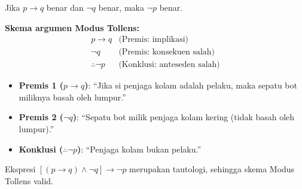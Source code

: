\begin{teorema}
Jika $p \rightarrow q$ benar dan $\neg q$ benar, maka $\neg p$ benar.
\end{teorema}

\textbf{Skema argumen Modus Tollens:}
\[
\begin{array}{cl}
p \rightarrow q & \text{(Premis: implikasi)} \\
\neg q & \text{(Premis: konsekuen salah)} \\
\hline
\therefore \neg p & \text{(Konklusi: anteseden salah)}
\end{array}
\]

\begin{contoh}
\begin{itemize}
    \item \textbf{Premis 1 ($p \rightarrow q$)}: ``Jika si penjaga kolam adalah pelaku, maka sepatu bot miliknya basah oleh lumpur.''
    \item \textbf{Premis 2 ($\neg q$)}: ``Sepatu bot milik penjaga kolam kering (tidak basah oleh lumpur).''
    \item \textbf{Konklusi ($\therefore \neg p$)}: ``Penjaga kolam bukan pelaku.''
\end{itemize}
\end{contoh}

Ekspresi $[(p \rightarrow q) \land \neg q] \rightarrow \neg p$ merupakan tautologi, sehingga skema Modus Tollens valid.
